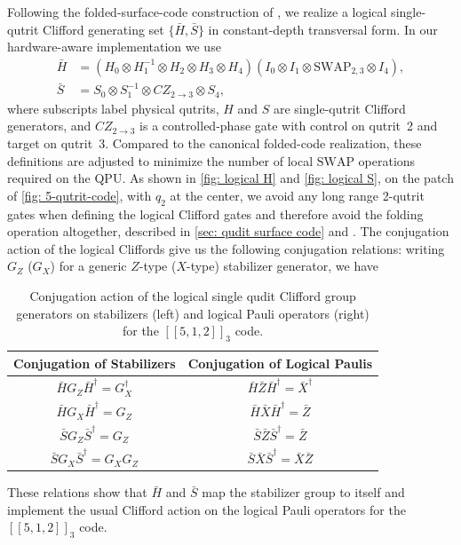 Following the folded-surface-code construction of
\cite{Moussa2016}, we realize a logical single-qutrit Clifford generating set $\{\bar H,\bar S\}$ in constant-depth transversal form. In our hardware-aware
implementation we use
\begin{align}
  \bar H &=
  (H_0 \otimes H_1^{-1} \otimes H_2 \otimes H_3 \otimes H_4)
  (I_0 \otimes I_1 \otimes \mathrm{SWAP}_{2,3} \otimes I_4), \\
  \bar S &= S_0 \otimes S_1^{-1} \otimes CZ_{2\rightarrow 3} \otimes S_4,
  \label{eq:logical_HS}
\end{align}
where subscripts label physical qutrits, $H$ and $S$ are single-qutrit Clifford generators, and $CZ_{2\rightarrow 3}$ is a controlled-phase gate with control on qutrit~2 and target on qutrit~3. Compared to the canonical folded-code realization, these definitions are adjusted to minimize the number of local $\mathrm{SWAP}$ operations required on the QPU. As shown in \autoref{fig: logical H} and \autoref{fig: logical S}, on the patch of \autoref{fig: 5-qutrit-code}, with $q_2$ at the center, we avoid any long range 2-qutrit gates when defining the logical Clifford gates and therefore avoid the folding operation altogether, described in \autoref{sec: qudit surface code} and \cite{Moussa2016}. The conjugation action of the logical Cliffords give us the following conjugation relations: writing $G_Z$ ($G_X$) for a generic $Z$-type ($X$-type) stabilizer generator, we have
\begin{table}[H]
  \centering
  \begin{tabular}{c|c}
    \hline
    Conjugation of Stabilizers
      & Conjugation of Logical Paulis\\
    \hline
    $\bar H G_Z \bar H^\dagger = G_X^\dagger$
      & $\bar H \bar Z \bar H^\dagger = \bar X^\dagger$ \\
    $\bar H G_X \bar H^\dagger = G_Z$
      & $\bar H \bar X \bar H^\dagger = \bar Z$ \\
    $\bar S G_Z \bar S^\dagger = G_Z$
      & $\bar S \bar Z \bar S^\dagger = \bar Z$ \\
    $\bar S G_X \bar S^\dagger = G_X G_Z$
      & $\bar S \bar X \bar S^\dagger = \bar X \bar Z$ \\
    \hline
  \end{tabular}
  \caption{Conjugation action of the logical single qudit Clifford group generators on
  stabilizers (left) and logical Pauli operators (right) for the  $[[5,1,2]]_3$ code.}
  \label{tab:clifford-conjugation}
\end{table}
These relations show that $\bar H$ and $\bar S$ map the stabilizer group to itself and implement the usual Clifford action on the logical Pauli operators for the $[[5,1,2]]_3$ code.

